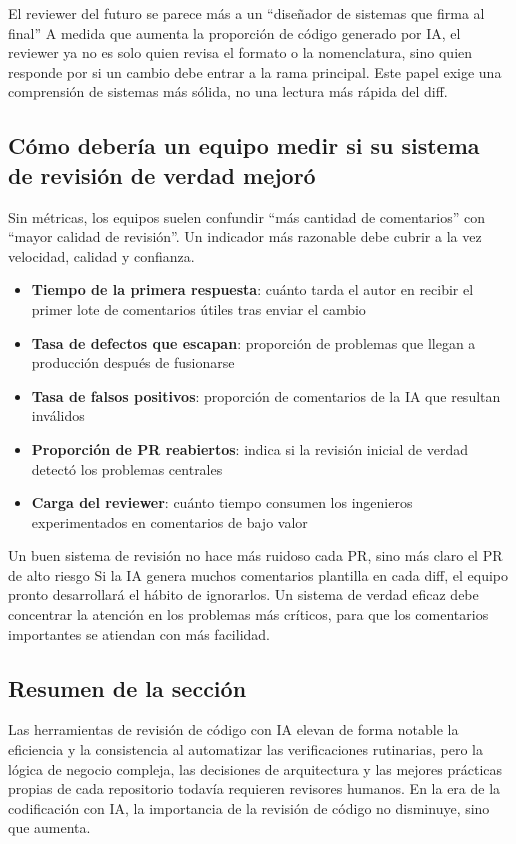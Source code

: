 \begin{importantbox}{El reviewer del futuro se parece más a un ``diseñador de sistemas que firma al final''}
A medida que aumenta la proporción de código generado por IA, el reviewer ya no es solo quien revisa el formato o la nomenclatura, sino quien responde por si un cambio debe entrar a la rama principal. Este papel exige una comprensión de sistemas más sólida, no una lectura más rápida del diff.
\end{importantbox}

\subsection{Cómo debería un equipo medir si su sistema de revisión de verdad mejoró}

Sin métricas, los equipos suelen confundir ``más cantidad de comentarios'' con ``mayor calidad de revisión''. Un indicador más razonable debe cubrir a la vez velocidad, calidad y confianza.

\begin{itemize}
    \item \textbf{Tiempo de la primera respuesta}: cuánto tarda el autor en recibir el primer lote de comentarios útiles tras enviar el cambio
    \item \textbf{Tasa de defectos que escapan}: proporción de problemas que llegan a producción después de fusionarse
    \item \textbf{Tasa de falsos positivos}: proporción de comentarios de la IA que resultan inválidos
    \item \textbf{Proporción de PR reabiertos}: indica si la revisión inicial de verdad detectó los problemas centrales
    \item \textbf{Carga del reviewer}: cuánto tiempo consumen los ingenieros experimentados en comentarios de bajo valor
\end{itemize}

\begin{knowledgebox}{Un buen sistema de revisión no hace más ruidoso cada PR, sino más claro el PR de alto riesgo}
Si la IA genera muchos comentarios plantilla en cada diff, el equipo pronto desarrollará el hábito de ignorarlos. Un sistema de verdad eficaz debe concentrar la atención en los problemas más críticos, para que los comentarios importantes se atiendan con más facilidad.
\end{knowledgebox}

\subsection{Resumen de la sección}

Las herramientas de revisión de código con IA elevan de forma notable la eficiencia y la consistencia al automatizar las verificaciones rutinarias, pero la lógica de negocio compleja, las decisiones de arquitectura y las mejores prácticas propias de cada repositorio todavía requieren revisores humanos. En la era de la codificación con IA, la importancia de la revisión de código no disminuye, sino que aumenta.
